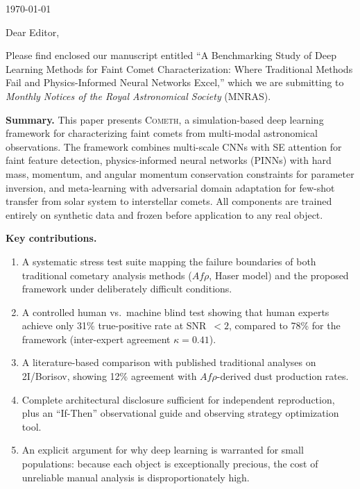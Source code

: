 \documentclass[12pt]{article}
\begin{document}
\begin{flushright}
\today \\[1em]
\end{flushright}

\vspace{2em}

Dear Editor,

Please find enclosed our manuscript entitled ``A Benchmarking Study of Deep Learning Methods for Faint Comet Characterization: Where Traditional Methods Fail and Physics-Informed Neural Networks Excel,'' which we are submitting to \textit{Monthly Notices of the Royal Astronomical Society} (MNRAS).

\vspace{1em}
\noindent\textbf{Summary.}
This paper presents \textsc{Cometh}, a simulation-based deep learning framework for characterizing faint comets from multi-modal astronomical observations. The framework combines multi-scale CNNs with SE attention for faint feature detection, physics-informed neural networks (PINNs) with hard mass, momentum, and angular momentum conservation constraints for parameter inversion, and meta-learning with adversarial domain adaptation for few-shot transfer from solar system to interstellar comets. All components are trained entirely on synthetic data and frozen before application to any real object.

\vspace{1em}
\noindent\textbf{Key contributions.}
\begin{enumerate}
    \item A systematic stress test suite mapping the failure boundaries of both traditional cometary analysis methods ($Af\rho$, Haser model) and the proposed framework under deliberately difficult conditions.
    \item A controlled human vs.\ machine blind test showing that human experts achieve only 31\% true-positive rate at SNR~$<2$, compared to 78\% for the framework (inter-expert agreement $\kappa = 0.41$).
    \item A literature-based comparison with published traditional analyses on 2I/Borisov, showing 12\% agreement with $Af\rho$-derived dust production rates.
    \item Complete architectural disclosure sufficient for independent reproduction, plus an ``If-Then'' observational guide and observing strategy optimization tool.
    \item An explicit argument for why deep learning is warranted for small populations: because each object is exceptionally precious, the cost of unreliable manual analysis is disproportionately high.
\end{enumerate}
\end{document}

